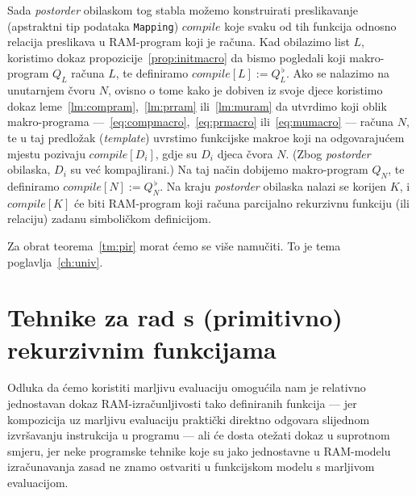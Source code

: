 Sada \emph{postorder} obilaskom tog stabla možemo konstruirati preslikavanje (apstraktni tip podataka \texttt{Mapping}) $compile$ koje svaku od tih funkcija odnosno relacija preslikava u RAM-program koji je računa. Kad obilazimo list $L$, koristimo dokaz propozicije~\ref{prop:initmacro} da bismo pogledali koji makro-program $Q_L$ računa $L$, te definiramo $compile[L]:=Q_L^{\,\flat}$. Ako se nalazimo na unutarnjem čvoru $N$, ovisno o tome kako je dobiven iz svoje djece koristimo dokaz leme~\ref{lm:compram},~\ref{lm:prram} ili~\ref{lm:muram} da utvrdimo koji oblik makro-programa ---~\eqref{eq:compmacro},~\eqref{eq:prmacro} ili~\eqref{eq:mumacro} --- računa $N$, te u taj predložak (\emph{template}) uvrstimo funkcijske makroe koji na odgovarajućem mjestu pozivaju $compile[D_i]$, gdje su $D_i$ djeca čvora $N$. (Zbog \emph{postorder} obilaska, $D_i$ su već kompajlirani.) Na taj način dobijemo makro-program $Q_N$, te definiramo $compile[N]:=Q_N^{\,\flat}$. Na kraju \emph{postorder} obilaska nalazi se korijen $K$, i $compile[K]$ će biti RAM-program koji računa parcijalno rekurzivnu funkciju (ili relaciju) zadanu simboličkom definicijom.

Za obrat teorema~\ref{tm:pir} morat ćemo se više namučiti. To je tema poglavlja~\ref{ch:univ}.

\section{Tehnike za rad s (primitivno) rekurzivnim funkcijama}\label{sec:tech}

Odluka da ćemo koristiti marljivu evaluaciju omogućila nam je relativno jednostavan dokaz RAM-izračunljivosti tako definiranih funkcija --- jer kompozicija uz marljivu evaluaciju praktički direktno odgovara slijednom izvršavanju instrukcija u programu --- ali će dosta otežati dokaz u suprotnom smjeru, jer neke programske tehnike koje su jako jednostavne u RAM-modelu izračunavanja zasad ne znamo ostvariti u funkcijskom modelu s marljivom evaluacijom.

